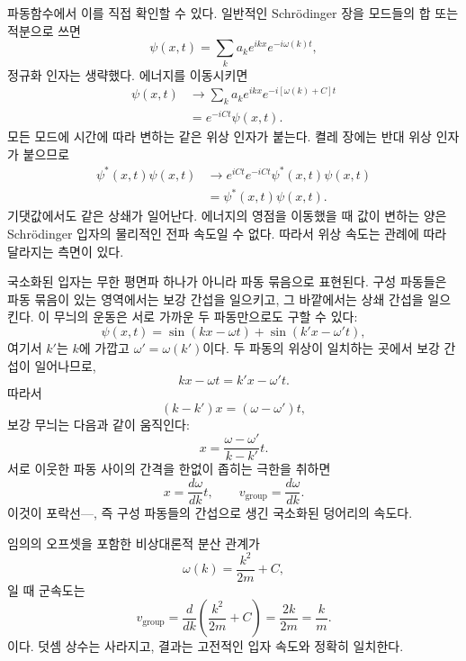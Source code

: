 파동함수에서 이를 직접 확인할 수 있다. 일반적인 Schr\"odinger 장을 모드들의 합 또는 적분으로 쓰면
\begin{equation}
\psi(x,t)=\sum_k a_k e^{ikx}e^{-i\omega(k)t},
\end{equation}
정규화 인자는 생략했다. 에너지를 이동시키면
\begin{align}
\psi(x,t)
&\longrightarrow
\sum_k a_k e^{ikx}e^{-i[\omega(k)+C]t}
\\
&=e^{-iCt}\psi(x,t).
\end{align}
모든 모드에 시간에 따라 변하는 같은 위상 인자가 붙는다. 켤레 장에는 반대 위상 인자가 붙으므로
\begin{equation}
\begin{aligned}
\psi^*(x,t)\psi(x,t)
&\longrightarrow
e^{iCt}e^{-iCt}\psi^*(x,t)\psi(x,t)
\\
&=\psi^*(x,t)\psi(x,t).
\end{aligned}
\end{equation}
기댓값에서도 같은 상쇄가 일어난다. 에너지의 영점을 이동했을 때 값이 변하는 양은 Schr\"odinger 입자의 물리적인 전파 속도일 수 없다. 따라서 위상 속도는 관례에 따라 달라지는 측면이 있다.

국소화된 입자는 무한 평면파 하나가 아니라 파동 묶음으로 표현된다. 구성 파동들은 파동 묶음이 있는 영역에서는 보강 간섭을 일으키고, 그 바깥에서는 상쇄 간섭을 일으킨다. 이 무늬의 운동은 서로 가까운 두 파동만으로도 구할 수 있다:
\begin{equation}
\psi(x,t)=
\sin(kx-\omega t)+
\sin(k'x-\omega't),
\end{equation}
여기서 \(k'\)는 \(k\)에 가깝고 \(\omega'=\omega(k')\)이다. 두 파동의 위상이 일치하는 곳에서 보강 간섭이 일어나므로,
\begin{equation}
kx-\omega t=k'x-\omega't.
\end{equation}
따라서
\begin{equation}
(k-k')x=(\omega-\omega')t,
\end{equation}
보강 무늬는 다음과 같이 움직인다:
\begin{equation}
x=\frac{\omega-\omega'}{k-k'}t.
\end{equation}
서로 이웃한 파동 사이의 간격을 한없이 좁히는 극한을 취하면
\begin{equation}
x=\frac{d\omega}{dk}t,
\qquad
v_{\mathrm{group}}=\frac{d\omega}{dk}.
\end{equation}
이것이 포락선---, 즉 구성 파동들의 간섭으로 생긴 국소화된 덩어리의 속도다.

임의의 오프셋을 포함한 비상대론적 분산 관계가
\begin{equation}
\omega(k)=\frac{k^2}{2m}+C,
\end{equation}
일 때 군속도는
\begin{equation}
v_{\mathrm{group}}
=\frac{d}{dk}\left(\frac{k^2}{2m}+C\right)
=\frac{2k}{2m}
=\frac{k}{m}.
\end{equation}
이다. 덧셈 상수는 사라지고, 결과는 고전적인 입자 속도와 정확히 일치한다.

